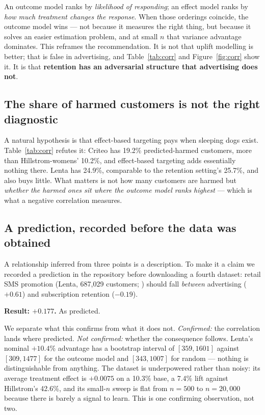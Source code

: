 \documentclass[11pt,a4paper]{article}
\begin{document}
An outcome model ranks by \emph{likelihood of responding}; an effect model ranks by
\emph{how much treatment changes the response}. When those orderings coincide, the
outcome model wins --- not because it measures the right thing, but because it
solves an easier estimation problem, and at small $n$ that variance advantage
dominates. This reframes the recommendation. It is not that uplift modelling is
better; that is false in advertising, and Table~\ref{tab:corr} and
Figure~\ref{fig:corr} show it. It is that
\textbf{retention has an adversarial structure that advertising does not}.

\subsection{The share of harmed customers is not the right diagnostic}

A natural hypothesis is that effect-based targeting pays when sleeping dogs exist.
Table~\ref{tab:corr} refutes it: Criteo has 19.2\% predicted-harmed customers, more
than Hillstrom-womens' 10.2\%, and effect-based targeting adds essentially nothing
there. Lenta has 24.9\%, comparable to the retention setting's 25.7\%, and also buys
little. What matters is not how many customers are harmed but \emph{whether the
harmed ones sit where the outcome model ranks highest} --- which is what a negative
correlation measures.

\subsection{A prediction, recorded before the data was obtained}

A relationship inferred from three points is a description. To make it a claim we
recorded a prediction in the repository before downloading a fourth dataset: retail
SMS promotion (Lenta, 687{,}029 customers; \citealp{sklift}) should fall
\emph{between} advertising
($+0.61$) and subscription retention ($-0.19$).

\textbf{Result: $+0.177$.} As predicted.

We separate what this confirms from what it does not. \emph{Confirmed:} the
correlation lands where predicted. \emph{Not confirmed:} whether the consequence
follows. Lenta's nominal $+10.4\%$ advantage has a bootstrap interval of
$[359, 1601]$ against $[309, 1477]$ for the outcome model and $[343, 1007]$ for
random --- nothing is distinguishable from anything. The dataset is underpowered
rather than noisy: its average treatment effect is $+0.0075$ on a 10.3\% base, a
7.4\% lift against Hillstrom's 42.6\%, and its small-$n$ sweep is flat from $n=500$
to $n=20{,}000$ because there is barely a signal to learn. This is one confirming
observation, not two.
\end{document}
